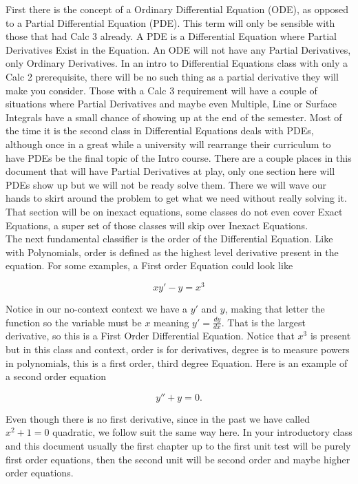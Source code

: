\documentclass[12pt]{article}
\begin{document}
First there is the concept of a Ordinary Differential Equation (ODE), as opposed to a Partial Differential Equation (PDE). This term will only be sensible with those that had Calc 3 already. A PDE is a Differential Equation where Partial Derivatives Exist in the Equation. An ODE will not have any Partial Derivatives, only Ordinary Derivatives. In an intro to Differential Equations class with only a Calc 2 prerequisite, there will be no such thing as a partial derivative they will make you consider. Those with a Calc 3 requirement will have a couple of situations where Partial Derivatives and maybe even Multiple, Line or Surface Integrals have a small chance of showing up at the end of the semester. Most of the time it is the second class in Differential Equations deals with PDEs, although once in a great while a university will rearrange their curriculum to have PDEs be the final topic of the Intro course. There are a couple places in this document that will have Partial Derivatives at play, only one section here will PDEs show up but we will not be ready solve them. There we will wave our hands to skirt around the problem to get what we need without really solving it. That section will be on inexact equations, some classes do not even cover Exact Equations, a super set of those classes will skip over Inexact Equations. \\

The next fundamental classifier is the order of the Differential Equation. Like with Polynomials, order is defined as the highest level derivative present in the equation. For some examples, a First order Equation could look like

\begin{equation*}
    xy'-y = x^3
\end{equation*}

Notice in our no-context context we have a $y'$ and $y$, making that letter the function so the variable must be $x$ meaning $y'=\frac{dy}{dx}$. That is the largest derivative, so this is a First Order Differential Equation. Notice that $x^3$ is present but in this class and context, order is for derivatives, degree is to measure powers in polynomials, this is a first order, third degree Equation. Here is an example of a second order equation

\begin{equation*}
    y''+y=0.
\end{equation*}

Even though there is no first derivative, since in the past we have called $x^2+1=0$ quadratic, we follow suit the same way here. In your introductory class and this document usually the first chapter up to the first unit test will be purely first order equations, then the second unit will be second order and maybe higher order equations. \\
\end{document}
